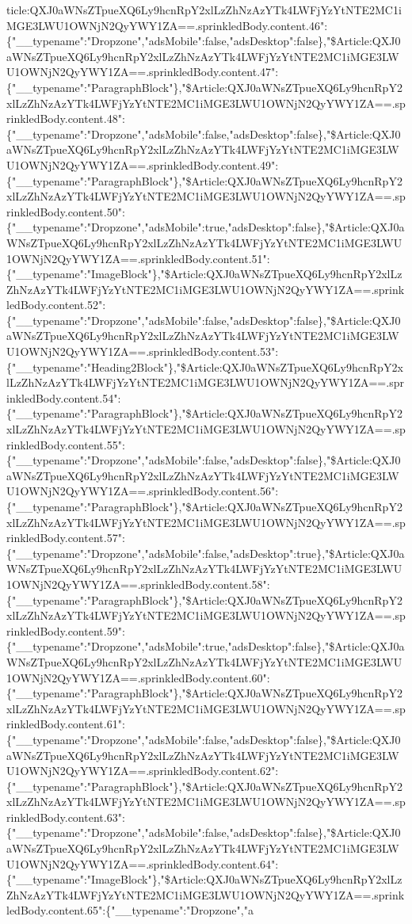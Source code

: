 ticle:QXJ0aWNsZTpueXQ6Ly9hcnRpY2xlLzZhNzAzYTk4LWFjYzYtNTE2MC1iMGE3LWU1OWNjN2QyYWY1ZA==.sprinkledBody.content.46":\{"\_\_typename":"Dropzone","adsMobile":false,"adsDesktop":false\},"\$Article:QXJ0aWNsZTpueXQ6Ly9hcnRpY2xlLzZhNzAzYTk4LWFjYzYtNTE2MC1iMGE3LWU1OWNjN2QyYWY1ZA==.sprinkledBody.content.47":\{"\_\_typename":"ParagraphBlock"\},"\$Article:QXJ0aWNsZTpueXQ6Ly9hcnRpY2xlLzZhNzAzYTk4LWFjYzYtNTE2MC1iMGE3LWU1OWNjN2QyYWY1ZA==.sprinkledBody.content.48":\{"\_\_typename":"Dropzone","adsMobile":false,"adsDesktop":false\},"\$Article:QXJ0aWNsZTpueXQ6Ly9hcnRpY2xlLzZhNzAzYTk4LWFjYzYtNTE2MC1iMGE3LWU1OWNjN2QyYWY1ZA==.sprinkledBody.content.49":\{"\_\_typename":"ParagraphBlock"\},"\$Article:QXJ0aWNsZTpueXQ6Ly9hcnRpY2xlLzZhNzAzYTk4LWFjYzYtNTE2MC1iMGE3LWU1OWNjN2QyYWY1ZA==.sprinkledBody.content.50":\{"\_\_typename":"Dropzone","adsMobile":true,"adsDesktop":false\},"\$Article:QXJ0aWNsZTpueXQ6Ly9hcnRpY2xlLzZhNzAzYTk4LWFjYzYtNTE2MC1iMGE3LWU1OWNjN2QyYWY1ZA==.sprinkledBody.content.51":\{"\_\_typename":"ImageBlock"\},"\$Article:QXJ0aWNsZTpueXQ6Ly9hcnRpY2xlLzZhNzAzYTk4LWFjYzYtNTE2MC1iMGE3LWU1OWNjN2QyYWY1ZA==.sprinkledBody.content.52":\{"\_\_typename":"Dropzone","adsMobile":false,"adsDesktop":false\},"\$Article:QXJ0aWNsZTpueXQ6Ly9hcnRpY2xlLzZhNzAzYTk4LWFjYzYtNTE2MC1iMGE3LWU1OWNjN2QyYWY1ZA==.sprinkledBody.content.53":\{"\_\_typename":"Heading2Block"\},"\$Article:QXJ0aWNsZTpueXQ6Ly9hcnRpY2xlLzZhNzAzYTk4LWFjYzYtNTE2MC1iMGE3LWU1OWNjN2QyYWY1ZA==.sprinkledBody.content.54":\{"\_\_typename":"ParagraphBlock"\},"\$Article:QXJ0aWNsZTpueXQ6Ly9hcnRpY2xlLzZhNzAzYTk4LWFjYzYtNTE2MC1iMGE3LWU1OWNjN2QyYWY1ZA==.sprinkledBody.content.55":\{"\_\_typename":"Dropzone","adsMobile":false,"adsDesktop":false\},"\$Article:QXJ0aWNsZTpueXQ6Ly9hcnRpY2xlLzZhNzAzYTk4LWFjYzYtNTE2MC1iMGE3LWU1OWNjN2QyYWY1ZA==.sprinkledBody.content.56":\{"\_\_typename":"ParagraphBlock"\},"\$Article:QXJ0aWNsZTpueXQ6Ly9hcnRpY2xlLzZhNzAzYTk4LWFjYzYtNTE2MC1iMGE3LWU1OWNjN2QyYWY1ZA==.sprinkledBody.content.57":\{"\_\_typename":"Dropzone","adsMobile":false,"adsDesktop":true\},"\$Article:QXJ0aWNsZTpueXQ6Ly9hcnRpY2xlLzZhNzAzYTk4LWFjYzYtNTE2MC1iMGE3LWU1OWNjN2QyYWY1ZA==.sprinkledBody.content.58":\{"\_\_typename":"ParagraphBlock"\},"\$Article:QXJ0aWNsZTpueXQ6Ly9hcnRpY2xlLzZhNzAzYTk4LWFjYzYtNTE2MC1iMGE3LWU1OWNjN2QyYWY1ZA==.sprinkledBody.content.59":\{"\_\_typename":"Dropzone","adsMobile":true,"adsDesktop":false\},"\$Article:QXJ0aWNsZTpueXQ6Ly9hcnRpY2xlLzZhNzAzYTk4LWFjYzYtNTE2MC1iMGE3LWU1OWNjN2QyYWY1ZA==.sprinkledBody.content.60":\{"\_\_typename":"ParagraphBlock"\},"\$Article:QXJ0aWNsZTpueXQ6Ly9hcnRpY2xlLzZhNzAzYTk4LWFjYzYtNTE2MC1iMGE3LWU1OWNjN2QyYWY1ZA==.sprinkledBody.content.61":\{"\_\_typename":"Dropzone","adsMobile":false,"adsDesktop":false\},"\$Article:QXJ0aWNsZTpueXQ6Ly9hcnRpY2xlLzZhNzAzYTk4LWFjYzYtNTE2MC1iMGE3LWU1OWNjN2QyYWY1ZA==.sprinkledBody.content.62":\{"\_\_typename":"ParagraphBlock"\},"\$Article:QXJ0aWNsZTpueXQ6Ly9hcnRpY2xlLzZhNzAzYTk4LWFjYzYtNTE2MC1iMGE3LWU1OWNjN2QyYWY1ZA==.sprinkledBody.content.63":\{"\_\_typename":"Dropzone","adsMobile":false,"adsDesktop":false\},"\$Article:QXJ0aWNsZTpueXQ6Ly9hcnRpY2xlLzZhNzAzYTk4LWFjYzYtNTE2MC1iMGE3LWU1OWNjN2QyYWY1ZA==.sprinkledBody.content.64":\{"\_\_typename":"ImageBlock"\},"\$Article:QXJ0aWNsZTpueXQ6Ly9hcnRpY2xlLzZhNzAzYTk4LWFjYzYtNTE2MC1iMGE3LWU1OWNjN2QyYWY1ZA==.sprinkledBody.content.65":\{"\_\_typename":"Dropzone","a